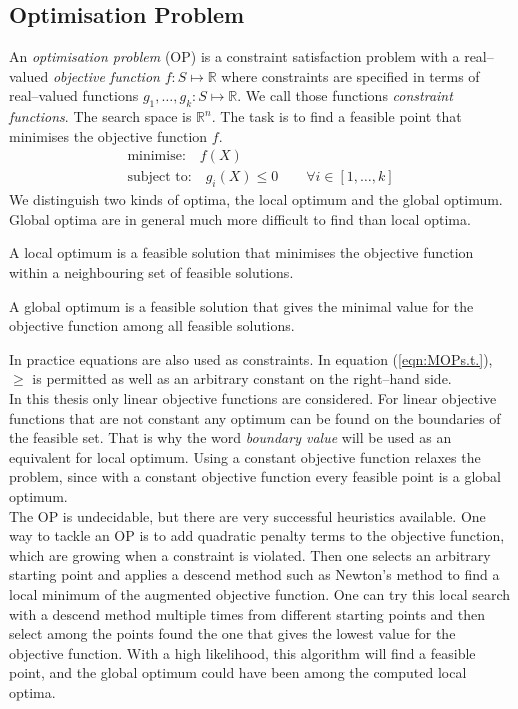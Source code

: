 \subsection{Optimisation Problem}
An \emph{optimisation problem} (OP) is a constraint satisfaction problem with a real--valued \emph{objective function} $f:S\mapsto \mathbb{R}$ where constraints are specified in terms of real--valued functions $g_1,\dots,g_k:S\mapsto\mathbb{R}$. We call those functions \emph{constraint functions}. The search space is $\mathbb{R}^n$. The task is to find a feasible point that minimises the objective function $f$.
\begin{eqnarray}
\text{minimise:} \quad f(X)\\
\text{subject to:} \quad g_i(X)\leq 0 \qquad \forall i\in\left[1,\dots ,k\right] \label{eqn:MOPs.t.}
\end{eqnarray}
We distinguish two kinds of optima, the local optimum and the global optimum. Global optima are in general much more difficult to find than local optima.
\begin{definition}
A local optimum is a feasible solution that minimises the objective function within a neighbouring set of feasible solutions.
\end{definition}
\begin{definition}
A global optimum is a feasible solution that gives the minimal value for the objective function among all feasible solutions.
\end{definition}
In practice equations are also used as constraints. In equation (\ref{eqn:MOPs.t.}), $\geq$ is permitted as well as an arbitrary constant on the right--hand side. \\
In this thesis only linear objective functions are considered. For linear objective functions that are not constant any optimum can be found on the boundaries of the feasible set. That is why the word \emph{boundary value} will be used as an equivalent for local optimum. Using a constant objective function relaxes the problem, since with a constant objective function every feasible point is a global optimum.\\
The OP is undecidable, but there are very successful heuristics available. One way to tackle an OP is to add quadratic penalty terms to the objective function, which are growing when a constraint is violated. Then one selects an arbitrary starting point and applies a descend method such as Newton's method to find a local minimum of the augmented objective function. One can try this local search with a descend method multiple times from different starting points and then select among the points found the one that gives the lowest value for the objective function. With a high likelihood, this algorithm will find a feasible point, and the global optimum could have been among the computed local optima.
